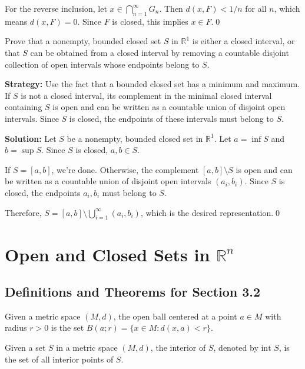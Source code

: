For the reverse inclusion, let $x \in \bigcap_{n=1}^{\infty} G_n$. Then $d(x,F) < 1/n$ for all $n$, which means $d(x,F) = 0$. Since $F$ is closed, this implies $x \in F$.\qed


\begin{problembox}
\begin{problemstatement}
Prove that a nonempty, bounded closed set $S$ in $\mathbb{R}^1$ is either a closed interval, or that $S$ can be obtained from a closed interval by removing a countable disjoint collection of open intervals whose endpoints belong to $S$.
\end{problemstatement}
\end{problembox}

\noindent\textbf{Strategy:} Use the fact that a bounded closed set has a minimum and maximum. If $S$ is not a closed interval, its complement in the minimal closed interval containing $S$ is open and can be written as a countable union of disjoint open intervals. Since $S$ is closed, the endpoints of these intervals must belong to $S$.

\bigskip\noindent\textbf{Solution:} Let $S$ be a nonempty, bounded closed set in $\mathbb{R}^1$. Let $a = \inf S$ and $b = \sup S$. Since $S$ is closed, $a, b \in S$.

If $S = [a,b]$, we're done. Otherwise, the complement $[a,b] \setminus S$ is open and can be written as a countable union of disjoint open intervals $(a_i, b_i)$. Since $S$ is closed, the endpoints $a_i, b_i$ must belong to $S$.

Therefore, $S = [a,b] \setminus \bigcup_{i=1}^{\infty} (a_i, b_i)$, which is the desired representation.\qed
\section{Open and Closed Sets in $\mathbb{R}^n$}

\subsection*{Definitions and Theorems for Section 3.2}

\begin{definition}
Given a metric space $(M,d)$, the open ball centered at a point $a \in M$ with radius $r > 0$ is the set $B(a;r) = \{x \in M : d(x,a) < r\}$.
\end{definition}

\begin{definition}
Given a set $S$ in a metric space $(M,d)$, the interior of $S$, denoted by $\text{int } S$, is the set of all interior points of $S$.
\end{definition}

